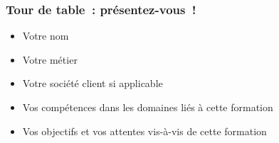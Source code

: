 \begin{frame}
  \frametitle{Tour de table~: présentez-vous~!}
  \begin{itemize}
    \item Votre nom
    \item Votre métier
    \item Votre société client si applicable
    \item Vos compétences dans les domaines liés à cette formation
    \item Vos objectifs et vos attentes vis-à-vis de cette formation
  \end{itemize}
\end{frame}
